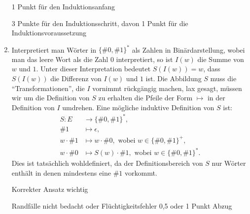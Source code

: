 \documentclass[12pt]{article}
\begin{document}
\begin{loesung}
\begin{enumerate}
          \begin{korrektur}
            1 Punkt für den Induktionsanfang

            3 Punkte für den Induktionsschritt, davon 1 Punkt für die Induktionsvoraussetzung
          \end{korrektur}
    \item Interpretiert man Wörter in $\{\#0, \#1\}^*$ als Zahlen in Binärdarstellung, wobei man das leere Wort als die Zahl $0$ interpretiert, so ist $I(w)$ die Summe von $w$ und $1$. Unter dieser Interpretation bedeutet $S(I(w)) = w$, dass $S(I(w))$ die Differenz von $I(w)$ und $1$ ist. Die Abbildung $S$ muss die \enquote{Transformationen}, die $I$ vornimmt rückgängig machen, lax gesagt, müssen wir um die Definition von $S$ zu erhalten die Pfeile der Form $\mapsto$ in der Definition von $I$ umdrehen. Eine mögliche induktive Definition von $S$ ist:
          \begin{align*}
            S \colon E &\to     \{\#0, \#1\}^*,\\
                   \#1 &\mapsto \epsilon,\\
           w \cdot \#1 &\mapsto w \cdot \#0, \text{ wobei } w \in \{\#0, \#1\}^+,\\
           w \cdot \#0 &\mapsto S(w) \cdot \#1, \text{ wobei } w \in \{\#0, \#1\}^*.
          \end{align*}
          Dies ist tatsächlich wohldefiniert, da der Definitionsbereich von $S$ nur Wörter enthält in denen mindestens eine $\#1$ vorkommt.

          \begin{korrektur}
            Korrekter Ansatz wichtig

            Randfälle nicht bedacht oder Flüchtigkeitsfehler 0,5 oder 1 Punkt Abzug
          \end{korrektur}
  \end{enumerate}
\end{loesung}

\end{document}
